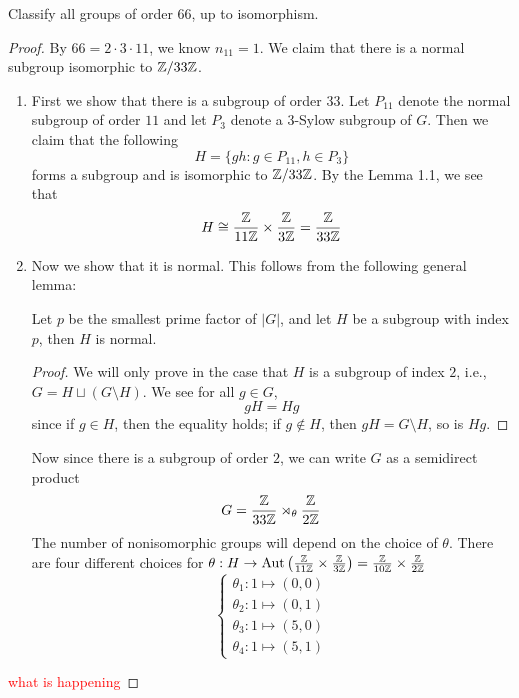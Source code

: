 \begin{prob}[S2016-Q1]
    Classify all groups of order $66$, up to isomorphism.
\end{prob}
\begin{proof}
    By $66=2\cdot 3\cdot 11$, we know $n_{11}=1$. We claim that there is a normal subgroup isomorphic to $\mathbb{Z}/33\mathbb{Z}$. 
    \begin{enumerate}
        \item First we show that there is a subgroup of order $33$. Let $P_{11}$ denote the normal subgroup of order $11$ and let $P_{3}$ denote a $3$-Sylow subgroup of $G$. Then we claim that the following
        \begin{equation*}
            H=\{gh: g\in P_{11}, h\in P_{3}\}
        \end{equation*}
        forms a subgroup and is isomorphic to $\mathbb{Z}/33\mathbb{Z}$. By the Lemma 1.1, we see that 
        \begin{equation*}
            H\cong\frac{\mathbb{Z}}{11\mathbb{Z}}\times\frac{\mathbb{Z}}{3\mathbb{Z}}=\frac{\mathbb{Z}}{33\mathbb{Z}}
        \end{equation*}
        \item Now we show that it is normal. This follows from the following general lemma:
        \begin{lem}
            Let $p$ be the smallest prime factor of $|G|$, and let $H$ be a subgroup with index $p$, then $H$ is normal.
        \end{lem}
        \begin{proof}
            We will only prove in the case that $H$ is a subgroup of index $2$, i.e., $G=H\sqcup (G\setminus H)$. We see for all $g\in G$, 
            \begin{equation*}
                gH=Hg
            \end{equation*}
            since if $g\in H$, then the equality holds; if $g\not\in H$, then $gH=G\setminus H$, so is $Hg$.  
        \end{proof}
        Now since there is a subgroup of order $2$, we can write $G$ as a semidirect product 
        \begin{equation*}
            G=\frac{\mathbb{Z}}{33\mathbb{Z}}\rtimes_\theta \frac{\mathbb{Z}}{2\mathbb{Z}}
        \end{equation*}
        The number of nonisomorphic groups will depend on the choice of $\theta$. There are four different choices for $\theta: H\to\text{Aut}\left(\frac{\mathbb{Z}}{11\mathbb{Z}}\times\frac{\mathbb{Z}}{3\mathbb{Z}}\right)=\frac{\mathbb{Z}}{10\mathbb{Z}}\times\frac{\mathbb{Z}}{2\mathbb{Z}}$
        \begin{equation*}
            \begin{cases}
                \theta_1: 1\mapsto (0,0)\\
                \theta_2: 1\mapsto (0,1)\\
                \theta_3: 1\mapsto (5, 0)\\
                \theta_4: 1\mapsto (5,1)
            \end{cases}
        \end{equation*}
    \end{enumerate} 
    \textcolor{red}{what is happening}
\end{proof}



